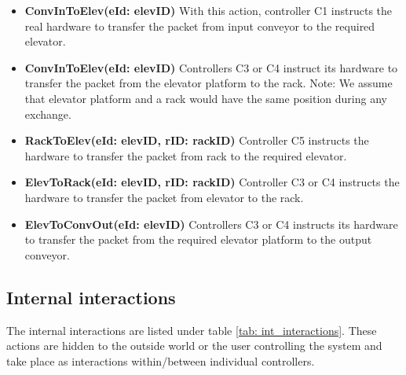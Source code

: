 \begin{itemize}
\item \textbf{ConvInToElev(eId: elevID)}
With this action, controller C1 instructs the real hardware to transfer the packet from input conveyor to the required elevator.

\item \textbf{ConvInToElev(eId: elevID)}
Controllers C3 or C4 instruct its hardware to transfer the packet from the elevator platform to the rack.
Note: We assume that elevator platform and a rack would have the same position during any exchange.

\item \textbf{RackToElev(eId: elevID, rID: rackID)}
Controller C5 instructs the hardware to transfer the packet from rack to the required elevator.

\item \textbf{ElevToRack(eId: elevID, rID: rackID)}
Controller C3 or C4 instructs the hardware to transfer the packet from elevator to the rack.

\item \textbf{ElevToConvOut(eId: elevID)}
Controllers C3 or C4 instructs its hardware to transfer the packet from the required elevator platform to the output conveyor.


\end{itemize}

\subsection*{Internal interactions}
The internal interactions are listed under table \ref{tab: int_interactions}. These actions are hidden to the outside world or the user controlling the system and take place as interactions within/between individual controllers.

